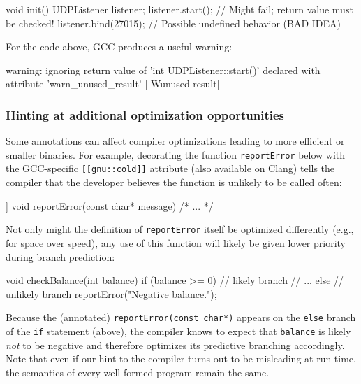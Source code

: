 \begin{emcppslisting}[language=C++]
void init()
{
    UDPListener listener;
    listener.start();      // Might fail; return value must be checked!
    listener.bind(27015);  // Possible undefined behavior (BAD IDEA)
}
\end{emcppslisting}
    
\noindent For the code above, GCC produces a useful warning:

\begin{emcppslisting}[style=plain]
warning: ignoring return value of 'int UDPListener::start()' declared
         with attribute 'warn_unused_result' [-Wunused-result]
\end{emcppslisting}
    

\subsubsection[Hinting at additional optimization opportunities]{Hinting at additional optimization opportunities}\label{hinting-at-additional-optimization-opportunities}

Some annotations can affect compiler optimizations leading to more
efficient or smaller binaries. For example, decorating the function
\lstinline!reportError! below with the GCC-specific
\lstinline![[gnu::cold]]! attribute (also available on Clang) tells the
compiler that the developer believes the function is unlikely to be
called often:

\begin{emcppslisting}[language=C++]
[[gnu::cold]] void reportError(const char* message) { /* ... */ }
\end{emcppslisting}
    
\noindent Not only might the definition of \lstinline!reportError! itself be
optimized differently (e.g., for space over speed), any use of this
function will likely be given lower priority during branch \mbox{prediction}:

\begin{emcppslisting}[language=C++]
void checkBalance(int balance)
{
    if (balance >= 0)  // likely branch
    {
        // ...
    }
    else  // unlikely branch
    {
        reportError("Negative balance.");
    }
}
\end{emcppslisting}
    
\noindent Because the (annotated) \lstinline!reportError(const!~\lstinline!char*)!
appears on the \lstinline!else! branch of the \lstinline!if! statement (above), the compiler 
knows to expect that \lstinline!balance! is likely \emph{not} to be
negative and therefore optimizes its predictive branching accordingly.
Note that even if our hint to the compiler turns out to be misleading at
run time, the semantics of every well-formed program remain the same.

